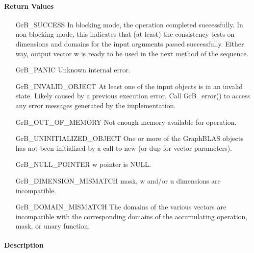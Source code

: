 \paragraph{Return Values}

\begin{itemize}[leftmargin=2.1in]
    \item[{\sf GrB\_SUCCESS}]         In blocking mode, the operation completed
	    successfully. In non-blocking mode, this indicates that (at least) the consistency 
    tests on dimensions and domains for the input arguments passed successfully. 
    Either way, output vector {\sf w} is ready to be used in the next method of 
    the sequence.

    \item[{\sf GrB\_PANIC}]            Unknown internal error.
    
    \item[{\sf GrB\_INVALID\_OBJECT}] At least one of the input objects is
	    in an invalid state. Likely caused by a previous execution error.
    Call {\sf GrB\_error()} to access 
    any error messages generated by the implementation.

    \item[{\sf GrB\_OUT\_OF\_MEMORY}]  Not enough memory available for operation.
    
    \item[{\sf GrB\_UNINITIALIZED\_OBJECT}] One or more of the GraphBLAS objects 
    has not been initialized by a call to {\sf new} (or {\sf dup} for vector
    parameters).
    
    \item[{\sf GrB\_NULL\_POINTER}]  {\sf w} pointer is {\sf NULL}.
    
    \item[{\sf GrB\_DIMENSION\_MISMATCH}]  {\sf mask}, {\sf w} and/or {\sf u} dimensions are
    incompatible. 
    
    \item[{\sf GrB\_DOMAIN\_MISMATCH}]    The domains of the various vectors are
	incompatible with the corresponding domains of the accumulating operation, 
    mask, or unary function.
\end{itemize}

\paragraph{Description}

